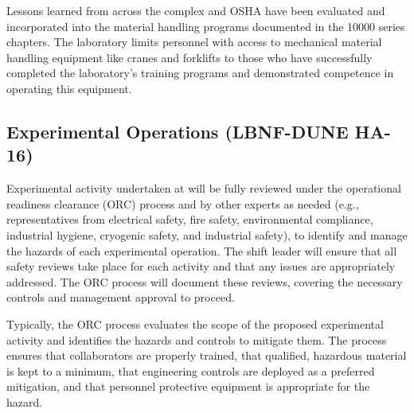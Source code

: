 Lessons learned from across the  complex and OSHA have been
evaluated and incorporated into the \fnal material handling programs
documented in the  10000 series chapters.  The laboratory
limits personnel with access to mechanical material handling equipment
like cranes and forklifts to those who have successfully completed the
laboratory's training programs and demonstrated competence in
operating this equipment.


\subsection{Experimental Operations (LBNF-DUNE HA-16)}
Experimental activity undertaken at  will be
fully reviewed under the operational readiness clearance (ORC) process
and by other experts as needed (e.g., representatives from electrical
safety, fire safety, environmental compliance, industrial hygiene,
cryogenic safety, and industrial safety), to identify and manage the
hazards of each experimental operation. The shift leader will ensure
that all safety reviews take place for each activity and that any
issues are appropriately addressed. The ORC process will document
these reviews, covering the necessary controls and management approval
to proceed.

Typically, the ORC process evaluates the scope of the proposed
experimental activity and identifies the hazards and controls to
mitigate them. The process ensures that collaborators are properly
trained, that qualified, hazardous material is kept to a minimum, that
engineering controls are deployed as a preferred mitigation, and that
personnel protective equipment is appropriate for the hazard.

